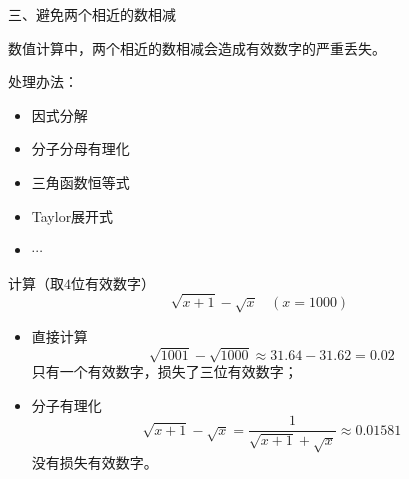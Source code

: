 \begin{frame} 
\begin{flushleft}
三、避免两个相近的数相减
\end{flushleft}
\pause 
数值计算中，两个相近的数相减会造成有效数字的严重丢失。
\pause 

\textcolor{acolor3}{处理办法}：
\begin{itemize}
\item
因式分解
\item
分子分母有理化
\item
三角函数恒等式
\item
Taylor展开式
\item
$\cdots$
\end{itemize}
 
\end{frame}
%
%
%
\begin{frame} 
\begin{li}
计算（取$4$位有效数字）
$$
\sqrt{x+1} -  \sqrt{x} ~~~~ (x = 1000)
$$
\end{li}
\pause
\begin{itemize}
\item
\textcolor{acolor5}{直接计算}
$$
\sqrt{1001} -  \sqrt{1000} \approx 31.64 - 31.62 = 0.02
$$
只有一个有效数字，损失了三位有效数字；\\[0.2cm]\pause
\item
\textcolor{acolor5}{分子有理化}
$$
\sqrt{x+1} -  \sqrt{x}  = \frac1{\sqrt{x+1} +  \sqrt{x}} \approx 0.01581
$$
没有损失有效数字。
\end{itemize}
\end{frame}

